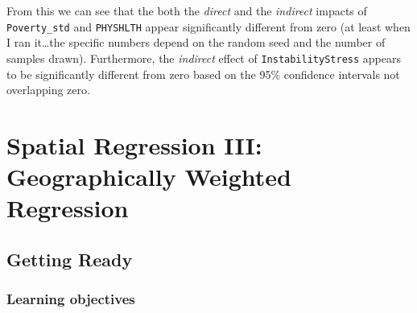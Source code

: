 \documentclass[
]{book}
\begin{document}
From this we can see that the both the \emph{direct} and the \emph{indirect} impacts of \texttt{Poverty\_std} and \texttt{PHYSHLTH} appear significantly different from zero (at least when I ran it\ldots the specific numbers depend on the random seed and the number of samples drawn). Furthermore, the \emph{indirect} effect of \texttt{InstabilityStress} appears to be significantly different from zero based on the 95\% confidence intervals not overlapping zero.

\hypertarget{spatial-regression-iii-geographically-weighted-regression}{%
\chapter{Spatial Regression III: Geographically Weighted Regression}\label{spatial-regression-iii-geographically-weighted-regression}}

\hypertarget{getting-ready-10}{%
\section{Getting Ready}\label{getting-ready-10}}

\hypertarget{learning-objectives-11}{%
\subsection{Learning objectives}\label{learning-objectives-11}}

 
  \providecommand{\huxb}[2]{\arrayrulecolor[RGB]{#1}\global\arrayrulewidth=#2pt}
  \providecommand{\huxvb}[2]{\color[RGB]{#1}\vrule width #2pt}
  \providecommand{\huxtpad}[1]{\rule{0pt}{#1}}
  \providecommand{\huxbpad}[1]{\rule[-#1]{0pt}{#1}}
\end{document}
